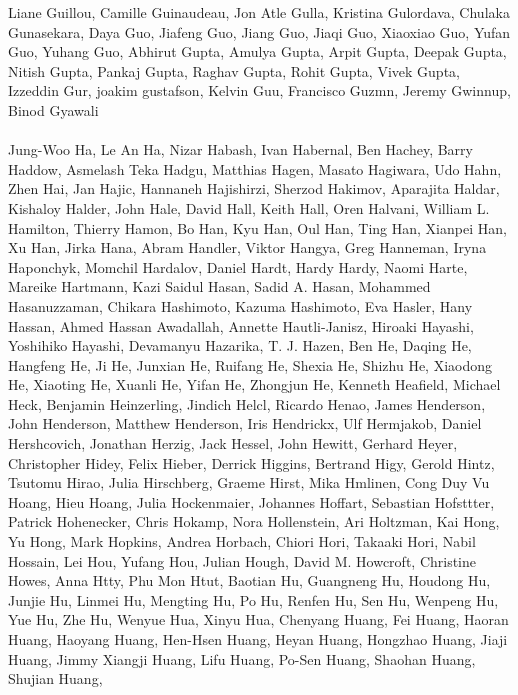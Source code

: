 \documentclass[11pt]{article}
\begin{document}
\begin{description}[itemsep=4mm, style=nextline]
Liane Guillou, 
Camille Guinaudeau, 
Jon Atle Gulla, 
Kristina Gulordava, 
Chulaka Gunasekara, 
Daya Guo, 
Jiafeng Guo, 
Jiang Guo, 
Jiaqi Guo, 
Xiaoxiao Guo, 
Yufan Guo, 
Yuhang Guo, 
Abhirut Gupta, 
Amulya Gupta, 
Arpit Gupta, 
Deepak Gupta, 
Nitish Gupta, 
Pankaj Gupta, 
Raghav Gupta, 
Rohit Gupta, 
Vivek Gupta, 
Izzeddin Gur, 
joakim gustafson, 
Kelvin Guu, 
Francisco Guzmn, 
Jeremy Gwinnup, 
Binod Gyawali
\\
\\
Jung-Woo Ha, 
Le An Ha, 
Nizar Habash, 
Ivan Habernal, 
Ben Hachey, 
Barry Haddow, 
Asmelash Teka Hadgu, 
Matthias Hagen, 
Masato Hagiwara, 
Udo Hahn, 
Zhen Hai, 
Jan Hajic, 
Hannaneh Hajishirzi, 
Sherzod Hakimov, 
Aparajita Haldar, 
Kishaloy Halder, 
John Hale, 
David Hall, 
Keith Hall, 
Oren Halvani, 
William L. Hamilton, 
Thierry Hamon, 
Bo Han, 
Kyu Han, 
Oul Han, 
Ting Han, 
Xianpei Han, 
Xu Han, 
Jirka Hana, 
Abram Handler, 
Viktor Hangya, 
Greg Hanneman, 
Iryna Haponchyk, 
Momchil Hardalov, 
Daniel Hardt, 
Hardy Hardy, 
Naomi Harte, 
Mareike Hartmann, 
Kazi Saidul Hasan, 
Sadid A. Hasan, 
Mohammed Hasanuzzaman, 
Chikara Hashimoto, 
Kazuma Hashimoto, 
Eva Hasler, 
Hany Hassan, 
Ahmed Hassan Awadallah, 
Annette Hautli-Janisz, 
Hiroaki Hayashi, 
Yoshihiko Hayashi, 
Devamanyu Hazarika, 
T. J. Hazen, 
Ben He, 
Daqing He, 
Hangfeng He, 
Ji He, 
Junxian He, 
Ruifang He, 
Shexia He, 
Shizhu He, 
Xiaodong He, 
Xiaoting He, 
Xuanli He, 
Yifan He, 
Zhongjun He, 
Kenneth Heafield, 
Michael Heck, 
Benjamin Heinzerling, 
Jindich Helcl, 
Ricardo Henao, 
James Henderson, 
John Henderson, 
Matthew Henderson, 
Iris Hendrickx, 
Ulf Hermjakob, 
Daniel Hershcovich, 
Jonathan Herzig, 
Jack Hessel, 
John Hewitt, 
Gerhard Heyer, 
Christopher Hidey, 
Felix Hieber, 
Derrick Higgins, 
Bertrand Higy, 
Gerold Hintz, 
Tsutomu Hirao, 
Julia Hirschberg, 
Graeme Hirst, 
Mika Hmlinen, 
Cong Duy Vu Hoang, 
Hieu Hoang, 
Julia Hockenmaier, 
Johannes Hoffart, 
Sebastian Hofsttter, 
Patrick Hohenecker, 
Chris Hokamp, 
Nora Hollenstein, 
Ari Holtzman, 
Kai Hong, 
Yu Hong, 
Mark Hopkins, 
Andrea Horbach, 
Chiori Hori, 
Takaaki Hori, 
Nabil Hossain, 
Lei Hou, 
Yufang Hou, 
Julian Hough, 
David M. Howcroft, 
Christine Howes, 
Anna Htty, 
Phu Mon Htut, 
Baotian Hu, 
Guangneng Hu, 
Houdong Hu, 
Junjie Hu, 
Linmei Hu, 
Mengting Hu, 
Po Hu, 
Renfen Hu, 
Sen Hu, 
Wenpeng Hu, 
Yue Hu, 
Zhe Hu, 
Wenyue Hua, 
Xinyu Hua, 
Chenyang Huang, 
Fei Huang, 
Haoran Huang, 
Haoyang Huang, 
Hen-Hsen Huang, 
Heyan Huang, 
Hongzhao Huang, 
Jiaji Huang, 
Jimmy Xiangji Huang, 
Lifu Huang, 
Po-Sen Huang, 
Shaohan Huang, 
Shujian Huang, 

\end{description}
\end{document}
